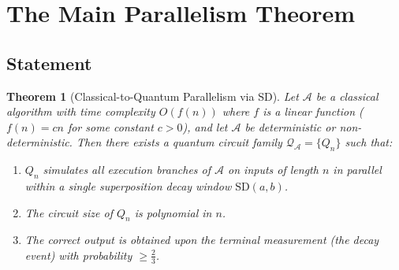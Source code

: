 \documentclass[11pt]{article}
\theoremstyle{plain}
\newtheorem{theorem}{Theorem}[section]
\theoremstyle{definition}
\theoremstyle{remark}
\newcommand{\SD}{\ensuremath{\mathrm{SD}}}   %
\newcommand{\QC}{\ensuremath{\mathcal{Q}}}   %
\begin{document}
\section{The Main Parallelism Theorem}
\label{sec:parallel}

\subsection{Statement}

\begin{theorem}[Classical-to-Quantum Parallelism via \SD]
  \label{thm:main}
  Let $\mathcal{A}$ be a classical algorithm with time complexity $O(f(n))$
  where $f$ is a linear function ($f(n) = cn$ for some constant $c > 0$),
  and let $\mathcal{A}$ be deterministic or non-deterministic.  Then there
  exists a quantum circuit family $\QC_{\mathcal{A}} = \{Q_n\}$ such that:
  \begin{enumerate}
    \item $Q_n$ simulates all execution branches of $\mathcal{A}$ on inputs
          of length $n$ in \emph{parallel} within a single superposition decay
          window $\SD(a, b)$.
    \item The circuit size of $Q_n$ is polynomial in $n$.
    \item The correct output is obtained upon the terminal measurement (the
          decay event) with probability $\geq \tfrac{2}{3}$.
  \end{enumerate}
\end{theorem}
\end{document}
